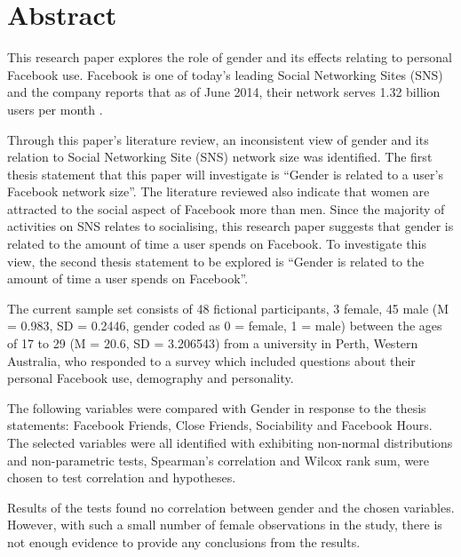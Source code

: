 \section{Abstract}

This research paper explores the role of gender and its effects relating to personal Facebook use. Facebook is one of today's leading Social Networking Sites (SNS) and the company reports that as of June 2014, their network serves 1.32 billion users per month \citep{Facebook2014}.

Through this paper's literature review, an inconsistent view of gender and its relation to Social Networking Site (SNS) network size was identified. The first thesis statement that this paper will investigate is ``Gender is related to a user's Facebook network size''. The literature reviewed also indicate that women are attracted to the social aspect of Facebook more than men. Since the majority of activities on SNS relates to socialising, this research paper suggests that gender is related to the amount of time a user spends on Facebook. To investigate this view, the second thesis statement to be explored is ``Gender is related to the amount of time a user spends on Facebook''.

The current sample set consists of 48 fictional participants, 3 female, 45 male (M = 0.983, SD = 0.2446, gender coded as 0 = female, 1 = male) between the ages of 17 to 29 (M = 20.6, SD = 3.206543) from a university in Perth, Western Australia, who responded to a survey which included questions about their personal Facebook use, demography and personality.

The following variables were compared with Gender in response to the thesis statements: Facebook Friends, Close Friends, Sociability and Facebook Hours. The selected variables were all identified with exhibiting non-normal distributions and non-parametric tests, Spearman's correlation and Wilcox rank sum, were chosen to test correlation and hypotheses.

Results of the tests found no correlation between gender and the chosen variables. However, with such a small number of female observations in the study, there is not enough evidence to provide any conclusions from the results.